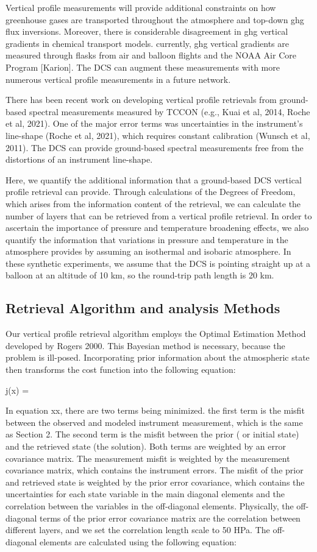 \documentclass[amt, manuscript]{copernicus}
\begin{document}
Vertical profile measurements will provide additional constraints on how greenhouse gases are transported throughout the atmosphere and top-down ghg flux inversions. Moreover, there is considerable disagreement in ghg vertical gradients in chemical transport models. currently, ghg vertical gradients are measured through flasks from air and balloon flights and the NOAA Air Core Program [Karion]. The DCS can augment these measurements with more numerous vertical profile measurements in a future network. 

There has been recent work on developing vertical profile retrievals from ground-based spectral measurements measured by TCCON (e.g., Kuai et al, 2014, Roche et al, 2021). One of the major error terms was uncertainties in the instrument’s line-shape (Roche et al, 2021), which requires constant calibration (Wunsch  et al, 2011). The DCS can provide ground-based spectral measurements free from the distortions of an instrument line-shape. 

Here, we quantify the additional information that a ground-based DCS vertical profile retrieval can provide. Through calculations of the Degrees of Freedom, which arises from the information content of the retrieval, we can calculate the number of layers that can be retrieved from a vertical profile retrieval. In order to ascertain the importance of pressure and temperature broadening effects, we also quantify the information that variations in pressure and temperature in the atmosphere provides by assuming an isothermal and isobaric atmosphere. In these synthetic experiments, we assume that the DCS is pointing straight up at a balloon at an altitude of 10 km, so the round-trip path length is 20 km.

\subsection{Retrieval Algorithm and analysis Methods }
Our vertical profile retrieval algorithm employs the Optimal Estimation Method developed by Rogers 2000. This Bayesian method is necessary, because the problem is ill-posed. Incorporating prior information about the atmospheric state then transforms the cost function into the following equation:

j(x) =

In equation xx, there are two terms being minimized. the first term is the misfit between the observed and modeled instrument measurement, which is the same as Section 2. The second term is the misfit between the prior ( or initial state) and the retrieved state (the solution). Both terms are weighted by an error covariance matrix. The measurement misfit is weighted by the measurement covariance matrix, which contains the instrument errors. The misfit of the prior and retrieved state is weighted by the prior error covariance, which contains the uncertainties for each state variable in the main diagonal elements and the correlation between the variables in the off-diagonal elements. Physically, the off-diagonal terms of the prior error covariance matrix are the correlation between different layers, and we set the correlation length scale to 50 HPa. The off-diagonal elements are calculated using the following equation:
\end{document}
